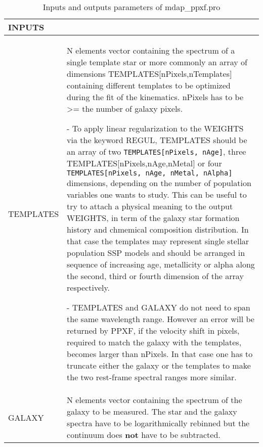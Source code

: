 \begin{center}
\begin{longtable}{p{2.7cm}| p{11.1cm}}
\caption{Inputs and outputs parameters of
  mdap\_ppxf.pro} \label{dap_tab:mdap_ppxf}
\\ \hline \endfirsthead

\hline
\endhead

\hline
\endlastfoot

\hline
{\bf  INPUTS} &  \\
\hline
   TEMPLATES &  N elements vector containing the spectrum of a single template star or more
       commonly an array of dimensions TEMPLATES[nPixels,nTemplates] containing
       different templates to be optimized during the fit of the kinematics.
       nPixels has to be >= the number of galaxy pixels.

      \smallskip 

     - To apply linear regularization to the WEIGHTS via the keyword REGUL,
       TEMPLATES should be an array of two {\tt TEMPLATES[nPixels, nAge]}, three
       TEMPLATES[nPixels,nAge,nMetal] or four {\tt TEMPLATES[nPixels, nAge, nMetal, nAlpha]}
       dimensions, depending on the number of population variables one wants to study.
       This can be useful to try to attach a physical meaning to the output WEIGHTS, in
       term of the galaxy star formation history and chmemical composition distribution.
       In that case the templates may represent single stellar population SSP models
       and should be arranged in sequence of increasing age, metallicity or alpha along 
       the second, third or fourth dimension of the array respectively.

      \smallskip 

     - TEMPLATES and GALAXY do not need to span the same wavelength range. However
       an error will be returned by PPXF, if the velocity shift in pixels,
       required to match the galaxy with the templates, becomes larger than
       nPixels. In that case one has to truncate either the galaxy or the
       templates to make the two rest-frame spectral ranges more similar. \\
%
   GALAXY &  N elements vector containing the spectrum of the galaxy to be measured. The
       star and the galaxy spectra have to be logarithmically rebinned but the
       continuum does {\bf not} have to be subtracted. 

      \smallskip 


\end{longtable}
\end{center}
